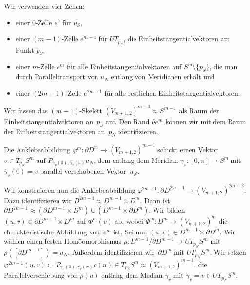 \documentclass[11pt, a4paper, german]{article}
\theoremstyle{definition}
\theoremstyle{remark}
\newcommand{\R}{\mathbb{R}} %
\newcommand{\V}[2]{V_{{#2},{#1}}} %
\newcommand{\homeo}{\approx} %
\begin{document}
Wir verwenden vier Zellen:

\begin{itemize}
  \item einer $0$-Zelle $e^0$ für $u_S$,
  \item einer $(m-1)$-Zelle $e^{m-1}$ für $UT_{p_S}$, die Einheitstangentialvektoren am Punkt $p_S$,
  \item einer $m$-Zelle $e^m$ für alle Einheitstangentialvektoren auf $S^m \setminus \{ p_S \}$, die man durch Paralleltransport von $u_N$ entlang von Meridianen erhält und
  \item einer $(2m - 1)$-Zelle $e^{2m-1}$ für alle restlichen Einheitstangentialvektoren.
\end{itemize}

Wir fassen das $(m-1)$-Skelett $(\V{2}{m+1})^{m-1} \homeo S^{m-1}$ als Raum der Einheitstangentialvektoren an~$p_S$ auf.
Den Rand $\partial e^m$ können wir mit dem Raum der Einheitstangentialvektoren an~$p_N$ identifizieren.

Die Anklebeabbildung $\varphi^m : \partial D^m \to (\V{2}{m+1})^{m-1}$ schickt einen Vektor $v \in T_{p_N} S^m$ auf $P_{\gamma_v(0),\gamma_v(\pi)} u_N$, dem entlang dem Meridian $\gamma_v : [0, \pi] \to S^m$ mit $\dot{\gamma_v}(0) = v$ parallel verschobenen Vektor~$u_N$.

Wir konstruieren nun die Anklebeabbildung $\varphi^{2m-1} : \partial D^{2m-1} \to (\V{2}{m+1})^{2m-2}$.
Dazu identifizieren wir $D^{2m-1} \homeo D^{m-1} \times D^m$.
Dann ist $\partial D^{2m-1} \homeo (\partial D^{m-1} \times D^m) \cup (D^{m-1} \times \partial D^m)$.
Wir bilden $(u, v) \in \partial D^{m-1} \times D^m$ auf $\Phi^m(v)$ ab, wobei $\Phi^m : D^m \to (\V{2}{m+1})^m$ die charakteristische Abbildung von~$e^m$ ist.
Sei nun $(u, v) \in D^{m-1} \times \partial D^m$.
Wir wählen einen festen Homöomorphismus $\rho : D^{m-1} / \partial D^{m-1} \to UT_{p_N} S^m$ mit $\rho([\partial D^{m-1}]) = u_N$.
Außerdem identifizieren wir~$\partial D^m$ mit $UT_{p_N} S^m$.
Wir setzen $\varphi^{2m-1}(u, v) \coloneqq P_{\gamma_v(0),\gamma_v(\pi)} \rho(u) \in T_{p_S} S^m \homeo (\V{2}{m+1})^{m-1}$, die Parallelverschiebung von $\rho(u)$ entlang dem Median $\gamma_v$ mit $\dot{\gamma}_v = v \in UT_{p_N} S^m$.
\end{document}
